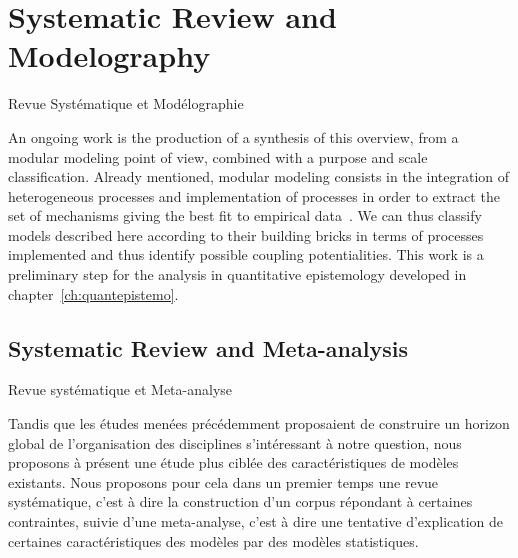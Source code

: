 



\newpage

\section{Systematic Review and Modelography}{Revue Systématique et Modélographie}







An ongoing work is the production of a synthesis of this overview, from a modular modeling point of view, combined with a purpose and scale classification. Already mentioned, modular modeling consists in the integration of heterogeneous processes and implementation of processes in order to extract the set of mechanisms giving the best fit to empirical data~\cite{cottineau2015incremental}. We can thus classify models described here according to their building bricks in terms of processes implemented and thus identify possible coupling potentialities. This work is a preliminary step for the analysis in quantitative epistemology developed in chapter~\ref{ch:quantepistemo}.



\subsection[Systematic Review][Revue Systématique]{Systematic Review and Meta-analysis}{Revue systématique et Meta-analyse}


Tandis que les études menées précédemment proposaient de construire un horizon global de l'organisation des disciplines s'intéressant à notre question, nous proposons à présent une étude plus ciblée des caractéristiques de modèles existants. Nous proposons pour cela dans un premier temps une revue systématique, c'est à dire la construction d'un corpus répondant à certaines contraintes, suivie d'une meta-analyse, c'est à dire une tentative d'explication de certaines caractéristiques des modèles par des modèles statistiques.













